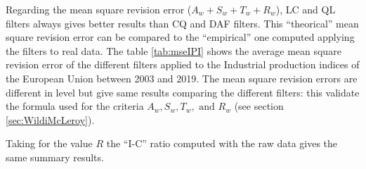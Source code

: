 \documentclass[
  12pt,
  ,
  a4paper]{article}
\newcommand\1{\mathds{1}}
\begin{document}
Regarding the mean square revision error (\(A_w+S_w+T_w+R_w\)), LC and QL filters always gives better results than CQ and DAF filters.
This ``theorical'' mean square revision error can be compared to the ``empirical'' one computed applying the filters to real data.
The table \ref{tab:mseIPI} shows the average mean square revision error of the different filters applied to the Industrial production indices of the European Union between 2003 and 2019.
The mean square revision errors are different in level but give same results comparing the different filters: this validate the formula used for the criteria \(A_w,S_w,T_w,\text{ and }R_w\) (see section \ref{sec:WildiMcLeroy}).

Taking for the value \(R\) the ``I-C'' ratio computed with the raw data gives the same summary results.
\end{document}
